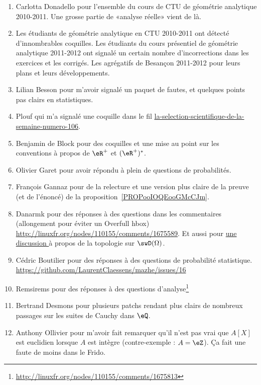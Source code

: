 \begin{enumerate}
    \item
        Carlotta Donadello pour l'ensemble du cours de CTU de géométrie analytique 2010-2011. Une grosse partie de «analyse réelle» vient de là.
    \item
        Les étudiants de géométrie analytique en CTU 2010-2011 ont détecté d'innombrables coquilles. Les étudiants du cours présentiel de géométrie analytique 2011-2012 ont signalé un certain nombre d'incorrections dans les exercices et les corrigés. Les agrégatifs de Besançon 2011-2012 pour leurs plans et leurs développements.
    \item
        Lilian Besson pour m'avoir signalé un paquet de fautes, et quelques points pas clairs en statistiques.
    \item
        Plouf qui m'a signalé une coquille dans le fil \href{http://passeurdesciences.blog.lemonde.fr/2014/01/24/la-selection-scientifique-de-la-semaine-numero-106}{la-selection-scientifique-de-la-semaine-numero-106}.
    \item
        Benjamin de Block pour des coquilles et une mise au point sur les conventions à propos de \( \eR^+\) et \( (\eR^+)^*\).
    \item
        Olivier Garet pour avoir répondu à plein de questions de probabilités.
    \item
        François Gannaz pour de la relecture et une version plus claire de la preuve (et de l'énoncé) de la proposition~\ref{PROPooIOQEooGMcCJm}.
    \item
        Danarmk pour des réponses à des questions dans les commentaires (allongement pour éviter un Overfull hbox) \url{http://linuxfr.org/nodes/110155/comments/1675589}. Et aussi pour \href{ https://github.com/LaurentClaessens/mazhe/issues/87 }{ une discussion } à propos de la topologie sur \( \swD(\Omega)\).
    \item
        Cédric Boutilier pour des réponses à des questions de probabilité statistique. \url{https://github.com/LaurentClaessens/mazhe/issues/16}
    \item
        Remsirems pour des réponses à des questions d'analyse\footnote{\url{http://linuxfr.org/nodes/110155/comments/1675813}}
    \item
        Bertrand Desmons pour plusieurs patchs rendant plus clairs de nombreux passages sur les suites de Cauchy dans \( \eQ\).
    \item
        Anthony Ollivier pour m'avoir fait remarquer qu'il n'est pas vrai que \( A[X]\) est euclidien lorsque \( A\) est intègre (contre-exemple : \( A=\eZ\)). Ça fait une faute de moins dans le Frido.

\end{enumerate}
